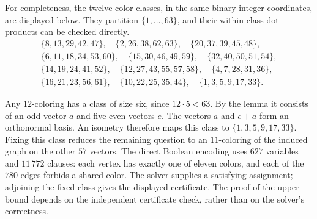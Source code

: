 For completeness, the twelve color classes, in the same binary integer
coordinates, are displayed below. They partition $\{1,\ldots,63\}$, and
their within-class dot products can be checked directly.
\[
\begin{gathered}
\{8,13,29,42,47\},\quad \{2,26,38,62,63\},\quad
\{20,37,39,45,48\},\\
\{6,11,18,34,53,60\},\quad \{15,30,46,49,59\},\quad
\{32,40,50,51,54\},\\
\{14,19,24,41,52\},\quad \{12,27,43,55,57,58\},\quad
\{4,7,28,31,36\},\\
\{16,21,23,56,61\},\quad \{10,22,25,35,44\},\quad
\{1,3,5,9,17,33\}.
\end{gathered}
\]

Any $12$-coloring has a class of size six, since $12\cdot5<63$.
By the lemma it
consists of an odd vector $a$ and five even vectors $e$. The vectors $a$ and
$e+a$ form an orthonormal basis. An isometry therefore maps this class to
$\{1,3,5,9,17,33\}$. Fixing this class reduces the remaining question to an
$11$-coloring of the induced graph on the other $57$ vectors.
The direct Boolean encoding uses $627$ variables and $11\,772$ clauses:
each vertex has exactly one of eleven colors, and each of the $780$ edges
forbids a shared color. The solver supplies a satisfying assignment;
adjoining the fixed class gives the displayed certificate. The proof of
the upper bound depends on the independent certificate check, rather than
on the solver's correctness.
